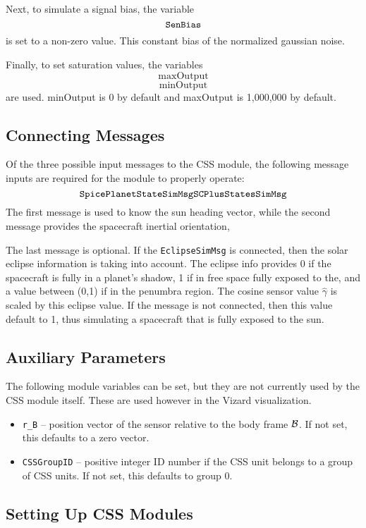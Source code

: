 Next, to simulate a signal bias, the variable
$$
	{\tt SenBias}
$$
is set to a non-zero value.   This constant bias of the normalized gaussian noise.  

Finally, to set saturation values, the variables
$$
	\mathrm{maxOutput}
	$$
	$$
	\mathrm{minOutput}
$$
are used. minOutput is  0 by default and maxOutput is 1,000,000 by default.

\subsection{Connecting Messages}
Of the three possible input messages to the CSS module, the following message inputs are required for the module to properly operate:
$$
	{\tt SpicePlanetStateSimMsg} \\
	{\tt SCPlusStatesSimMsg}
$$
The first message is used to know the sun heading vector, while the second message provides the spacecraft inertial orientation,

The last message is optional.  If the {\tt EclipseSimMsg} is connected, then the solar eclipse information is taking into account.  The eclipse info provides 0 if the spacecraft is fully in a planet's shadow, 1 if in free space fully exposed to the, and a value between (0,1) if in the penumbra region.  The cosine sensor value $\hat\gamma$ is scaled by this eclipse value.  If the message is not connected, then this value default to 1, thus simulating a spacecraft that is fully exposed to the sun.  


\subsection{Auxiliary Parameters}
The following module variables can be set, but they are not currently used by the CSS module itself.  These are used however in the Vizard visualization.  
\begin{itemize}
	\item {\tt r\_B} -- position vector of the sensor relative to the body frame $\cal B$.  If not set, this defaults to a zero vector.
	\item {\tt CSSGroupID} -- positive integer ID number if the CSS unit belongs to a group of CSS units.  If not set, this defaults to group 0.
\end{itemize}


\subsection{Setting Up CSS Modules}
